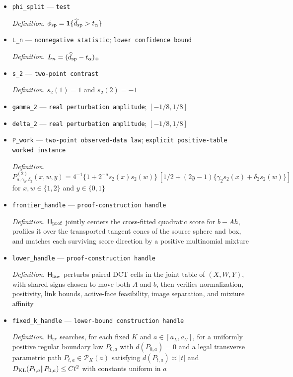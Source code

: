 \documentclass{article}
\begin{document}
\begin{itemize}
  \item \texttt{phi\_\allowbreak{}split} --- \texttt{test}
  \par\smallskip\noindent\emph{Definition.} \(\phi_{\rm sp}=\mathbf 1\{\widehat d_{\rm sp}>t_\alpha\}\)
  \item \texttt{L\_\allowbreak{}n} --- \texttt{nonnegative statistic}; \texttt{lower confidence bound}
  \par\smallskip\noindent\emph{Definition.} \(L_n=(\widehat d_{\rm sp}-t_\alpha)_+\)
  \item \texttt{s\_\allowbreak{}2} --- \texttt{two-\allowbreak{}point contrast}
  \par\smallskip\noindent\emph{Definition.} \(s_2(1)=1\) and \(s_2(2)=-1\)
  \item \texttt{gamma\_\allowbreak{}2} --- \texttt{real perturbation amplitude}; \([-1/8,1/8]\)
  \item \texttt{delta\_\allowbreak{}2} --- \texttt{real perturbation amplitude}; \([-1/8,1/8]\)
  \item \texttt{P\_\allowbreak{}work} --- \texttt{two-\allowbreak{}point observed-\allowbreak{}data law}; \texttt{explicit positive-\allowbreak{}table worked instance}
  \par\smallskip\noindent\emph{Definition.} \(P^{(2)}_{a,\gamma_2,\delta_2}(x,w,y)=4^{-1}\{1+2^{-a}s_2(x)s_2(w)\}\,[1/2+(2y-1)\{\gamma_2s_2(x)+\delta_2s_2(w)\}]\) for \(x,w\in\{1,2\}\) and \(y\in\{0,1\}\)
  \item \texttt{frontier\_\allowbreak{}handle} --- \texttt{proof-\allowbreak{}construction handle}
  \par\smallskip\noindent\emph{Definition.} \(\mathsf H_{\rm prof}\) jointly centers the cross-fitted quadratic score for \(b-Ah\), profiles it over the transported tangent cones of the source sphere and box, and matches each surviving score direction by a positive multinomial mixture
  \item \texttt{lower\_\allowbreak{}handle} --- \texttt{proof-\allowbreak{}construction handle}
  \par\smallskip\noindent\emph{Definition.} \(\mathsf H_{\rm law}\) perturbs paired DCT cells in the joint table of \((X,W,Y)\), with shared signs chosen to move both \(A\) and \(b\), then verifies normalization, positivity, link bounds, active-face feasibility, image separation, and mixture affinity
  \item \texttt{fixed\_\allowbreak{}k\_\allowbreak{}handle} --- \texttt{lower-\allowbreak{}bound construction handle}
  \par\smallskip\noindent\emph{Definition.} \(\mathsf H_{\rm tr}\) searches, for each fixed \(K\) and \(a\in[a_L,a_U]\), for a uniformly positive regular boundary law \(P_{0,a}\) with \(d(P_{0,a})=0\) and a legal transverse parametric path \(P_{t,a}\in\mathcal P_K(a)\) satisfying \(d(P_{t,a})\asymp |t|\) and \(D_{\rm KL}(P_{t,a}\|P_{0,a})\le C t^2\) with constants uniform in \(a\)

\end{itemize}
\end{document}
